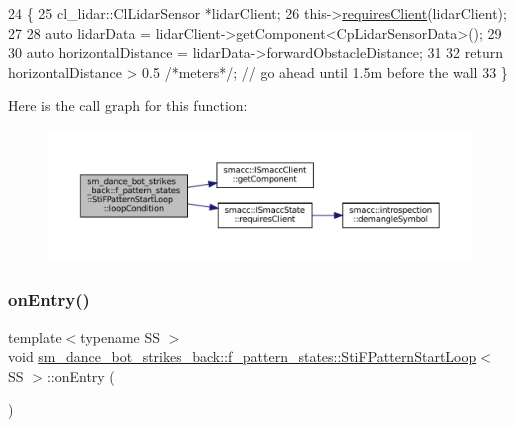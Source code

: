 \begin{DoxyCode}
24   \{
25     cl\_lidar::ClLidarSensor *lidarClient;
26     this->\hyperlink{classsmacc_1_1ISmaccState_a7f95c9f0a6ea2d6f18d1aec0519de4ac}{requiresClient}(lidarClient);
27 
28     \textcolor{keyword}{auto} lidarData = lidarClient->getComponent<CpLidarSensorData>();
29 
30     \textcolor{keyword}{auto} horizontalDistance = lidarData->forwardObstacleDistance;
31 
32     \textcolor{keywordflow}{return} horizontalDistance > 0.5 \textcolor{comment}{/*meters*/}; \textcolor{comment}{// go ahead until 1.5m before the wall}
33   \}
\end{DoxyCode}
Here is the call graph for this function\+:
\nopagebreak
\begin{figure}[H]
\begin{center}
\leavevmode
\includegraphics[width=350pt]{structsm__dance__bot__strikes__back_1_1f__pattern__states_1_1StiFPatternStartLoop_a6afa94fcfe689fa8ab1e1f521d04a8b4_cgraph}
\end{center}
\end{figure}
\mbox{\label{structsm__dance__bot__strikes__back_1_1f__pattern__states_1_1StiFPatternStartLoop_a2f10c47b15ecf1f5aa36781436e3e7aa}} 
\subsubsection{\texorpdfstring{on\+Entry()}{onEntry()}}
{\footnotesize\ttfamily template$<$typename SS $>$ \\
void \hyperlink{structsm__dance__bot__strikes__back_1_1f__pattern__states_1_1StiFPatternStartLoop}{sm\+\_\+dance\+\_\+bot\+\_\+strikes\+\_\+back\+::f\+\_\+pattern\+\_\+states\+::\+Sti\+F\+Pattern\+Start\+Loop}$<$ SS $>$\+::on\+Entry (\begin{DoxyParamCaption}{ }\end{DoxyParamCaption})\hspace{0.3cm}{\ttfamily [inline]}}



